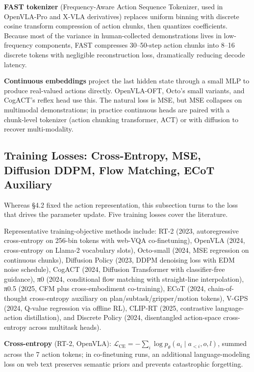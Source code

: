 \documentclass{article}
\begin{document}
\textbf{FAST tokenizer} (Frequency-Aware Action Sequence Tokenizer, used in OpenVLA-Pro and X-VLA derivatives) replaces uniform binning with discrete cosine transform compression of action chunks, then quantizes coefficients. Because most of the variance in human-collected demonstrations lives in low-frequency components, FAST compresses 30--50-step action chunks into 8--16 discrete tokens with negligible reconstruction loss, dramatically reducing decode latency.

\textbf{Continuous embeddings} project the last hidden state through a small MLP to produce real-valued actions directly. OpenVLA-OFT, Octo's small variants, and CogACT's reflex head use this. The natural loss is MSE, but MSE collapses on multimodal demonstrations; in practice continuous heads are paired with a chunk-level tokenizer (action chunking transformer, ACT) or with diffusion to recover multi-modality.

\subsection{Training Losses: Cross-Entropy, MSE, Diffusion DDPM, Flow Matching, ECoT Auxiliary}\label{training-losses-cross-entropy-mse-diffusion-ddpm-flow-matching-ecot-auxiliary}

Whereas §4.2 fixed the action representation, this subsection turns to the loss that drives the parameter update. Five training losses cover the literature.

Representative training-objective methods include: RT-2 (2023, autoregressive cross-entropy on 256-bin tokens with web-VQA co-finetuning), OpenVLA (2024, cross-entropy on Llama-2 vocabulary slots), Octo-small (2024, MSE regression on continuous chunks), Diffusion Policy (2023, DDPM denoising loss with EDM noise schedule), CogACT (2024, Diffusion Transformer with classifier-free guidance), π0 (2024, conditional flow matching with straight-line interpolation), π0.5 (2025, CFM plus cross-embodiment co-training), ECoT (2024, chain-of-thought cross-entropy auxiliary on plan/subtask/gripper/motion tokens), V-GPS (2024, Q-value regression via offline RL), CLIP-RT (2025, contrastive language-action distillation), and Discrete Policy (2024, disentangled action-space cross-entropy across multitask heads).

\textbf{Cross-entropy} (RT-2, OpenVLA): \(\mathcal{L}_{\text{CE}} = -\sum_{i} \log p_\theta(a_i \mid a_{<i}, o, l)\), summed across the 7 action tokens; in co-finetuning runs, an additional language-modeling loss on web text preserves semantic priors and prevents catastrophic forgetting.
\end{document}
